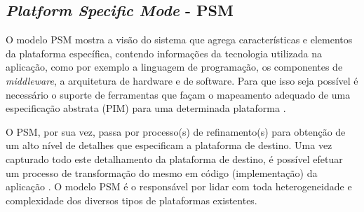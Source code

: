 \subsection{\textit{Platform Specific Mode} - PSM}

O modelo PSM mostra a visão do sistema que agrega características e elementos da plataforma específica, contendo informações da tecnologia utilizada na aplicação, como por exemplo a linguagem de programação, os componentes de \textit{middleware}, a arquitetura de hardware e de software. Para que isso seja possível é necessário o suporte de ferramentas que façam o mapeamento adequado de uma especificação abstrata (PIM) para uma determinada plataforma \cite{miller2003}. 

O PSM, por sua vez, passa por processo(s) de refinamento(s) para obtenção de um alto nível de detalhes que especificam a plataforma de destino. Uma vez capturado todo este detalhamento da plataforma de destino, é possível efetuar um processo de transformação do mesmo em código (implementação) da aplicação \cite{miller2003}. O modelo PSM é o responsável por lidar com toda heterogeneidade e complexidade dos diversos tipos de plataformas existentes.




